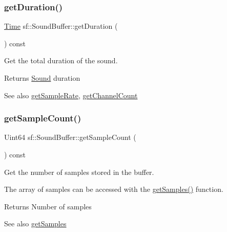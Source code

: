 \subsubsection{\texorpdfstring{get\+Duration()}{getDuration()}}
{\footnotesize\ttfamily \hyperlink{classsf_1_1_time}{Time} sf\+::\+Sound\+Buffer\+::get\+Duration (\begin{DoxyParamCaption}{ }\end{DoxyParamCaption}) const}



Get the total duration of the sound. 

\begin{DoxyReturn}{Returns}
\hyperlink{classsf_1_1_sound}{Sound} duration
\end{DoxyReturn}
\begin{DoxySeeAlso}{See also}
\hyperlink{classsf_1_1_sound_buffer_a2c2cf0078ce0549246ecc4a1646212b4}{get\+Sample\+Rate}, \hyperlink{classsf_1_1_sound_buffer_a127707b831d875ed790eef1aa2b9fcc3}{get\+Channel\+Count} 
\end{DoxySeeAlso}
\mbox{\label{classsf_1_1_sound_buffer_aebe2a4bdbfbd9249353748da3f6a4fa1}} 
\subsubsection{\texorpdfstring{get\+Sample\+Count()}{getSampleCount()}}
{\footnotesize\ttfamily Uint64 sf\+::\+Sound\+Buffer\+::get\+Sample\+Count (\begin{DoxyParamCaption}{ }\end{DoxyParamCaption}) const}



Get the number of samples stored in the buffer. 

The array of samples can be accessed with the \hyperlink{classsf_1_1_sound_buffer_ab9b2525a8da64cb266ba728aff7adecb}{get\+Samples()} function.

\begin{DoxyReturn}{Returns}
Number of samples
\end{DoxyReturn}
\begin{DoxySeeAlso}{See also}
\hyperlink{classsf_1_1_sound_buffer_ab9b2525a8da64cb266ba728aff7adecb}{get\+Samples} 
\end{DoxySeeAlso}
\mbox{\label{classsf_1_1_sound_buffer_a2c2cf0078ce0549246ecc4a1646212b4}} 
